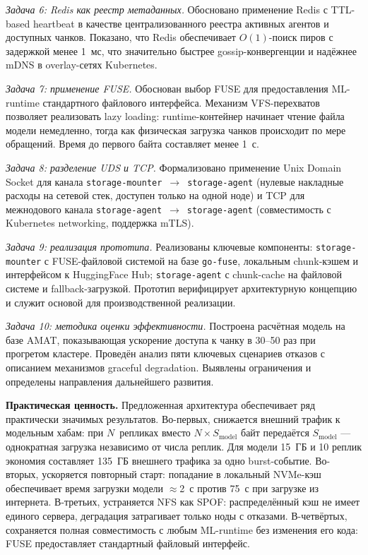 \textit{Задача 6: Redis как реестр метаданных.} Обосновано применение Redis с TTL-based heartbeat в качестве централизованного реестра активных агентов и доступных чанков. Показано, что Redis обеспечивает $O(1)$-поиск пиров с задержкой менее 1~мс, что значительно быстрее gossip-конвергенции и надёжнее mDNS в overlay-сетях Kubernetes.

\textit{Задача 7: применение FUSE.} Обоснован выбор FUSE для предоставления ML-runtime стандартного файлового интерфейса. Механизм VFS-перехватов позволяет реализовать lazy loading: runtime-контейнер начинает чтение файла модели немедленно, тогда как физическая загрузка чанков происходит по мере обращений. Время до первого байта составляет менее 1~с.

\textit{Задача 8: разделение UDS и TCP.} Формализовано применение Unix Domain Socket для канала \texttt{storage-mounter}~$\to$~\texttt{storage-agent} (нулевые накладные расходы на сетевой стек, доступен только на одной ноде) и TCP для межнодового канала \texttt{storage-agent}~$\to$~\texttt{storage-agent} (совместимость с Kubernetes networking, поддержка mTLS).

\textit{Задача 9: реализация прототипа.} Реализованы ключевые компоненты: \texttt{storage-mounter} с FUSE-файловой системой на базе \texttt{go-fuse}, локальным chunk-кэшем и интерфейсом к HuggingFace Hub; \texttt{storage-agent} с chunk-cache на файловой системе и fallback-загрузкой. Прототип верифицирует архитектурную концепцию и служит основой для производственной реализации.

\textit{Задача 10: методика оценки эффективности.} Построена расчётная модель на базе AMAT, показывающая ускорение доступа к чанку в 30--50 раз при прогретом кластере. Проведён анализ пяти ключевых сценариев отказов с описанием механизмов graceful degradation. Выявлены ограничения и определены направления дальнейшего развития.

\textbf{Практическая ценность.} Предложенная архитектура обеспечивает ряд практически значимых результатов. Во-первых, снижается внешний трафик к модельным хабам: при $N$~репликах вместо $N \times S_{\mathrm{model}}$ байт передаётся $S_{\mathrm{model}}$ --- однократная загрузка независимо от числа реплик. Для модели 15~ГБ и 10 реплик экономия составляет 135~ГБ внешнего трафика за одно burst-событие. Во-вторых, ускоряется повторный старт: попадание в локальный NVMe-кэш обеспечивает время загрузки модели $\approx$2~с против 75~с при загрузке из интернета. В-третьих, устраняется NFS как SPOF: распределённый кэш не имеет единого сервера, деградация затрагивает только ноды с отказами. В-четвёртых, сохраняется полная совместимость с любым ML-runtime без изменения его кода: FUSE предоставляет стандартный файловый интерфейс.

